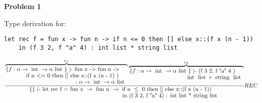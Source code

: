 
\usepackage{algorithm}
\usepackage{listings}
\usepackage{booktabs}
\usepackage{mathtools}
\usepackage{graphicx,amssymb,amsmath}
\usepackage{epstopdf}
\usepackage[T1]{fontenc}
\sloppy

\oddsidemargin 0in
\evensidemargin 0in
\textwidth 6.5in
\topmargin -0.5in
\textheight 9.0in




\pagestyle{myheadings}  %

	 	
\textbf{Problem 1}
	
	Type derivation for:

	\begin{lstlisting}
let rec f = fun x -> fun n -> if n <= 0 then [] else x::(f x (n - 1))
	in (f 3 2, f "a" 4) : int list * string list
	\end{lstlisting}	
	
\def \tauone {\alpha \rightarrow \text{ int } \rightarrow \alpha \text{ list } }	
\def \tauoneint  { \text{ int } \rightarrow \text{ int } \rightarrow  \text{ int } \text{ list } }
\def \tauonestring  { \text{ string } \rightarrow \text{ int } \rightarrow  \text{ string } \text{ list } }
\def \tautwo {\alpha }	
\def \tautwoint {\text{ int } }	
\def \tautwostring {\text{ string } }	
\def \tauthree { \text{ int } }	
\def \taufour {\alpha \text{ list } }	
\def \taufourint {\text{ int } \text{ list } }	
\def \taufourstring {\text{ string } \text{ list } }
\def \tauintstringlisttuple { \taufourint * \taufourstring }
	
\begin{equation}
\frac
{
	\overbrace{
    		\splitfrac
    		{ 
    			\{ f: \tauone \} \text{ |- fun x -> fun n -> }
    		} 
    		{ 
    			\splitfrac
    			{
    				\text{ if n <= 0 then [] else x::(f x (n - 1) ) }
    			}
    			{
    				: \tauone
    			}
    		}
	}^{e_1}
	\overbrace{
    		\splitfrac
    		{ 
    			\{ f: \tauone \} \text{ |- (f 3 2, f "a" 4 ) }
    		} 
    		{ 
    			\tauintstringlisttuple
    		}
	}^{e_2}
}
{
	\splitfrac
	{ 
		\{ \} \text{ |- let rec f = fun x } \rightarrow \text{ fun n } \rightarrow \text{ if n } \leq \text{  0 then [] else x::(f x (n - 1)) } 
	} 
	{ 
		\text{in (f 3 2, f "a" 4) : int list * string list } 
	}
}  
{
	REC
}
\end{equation}

